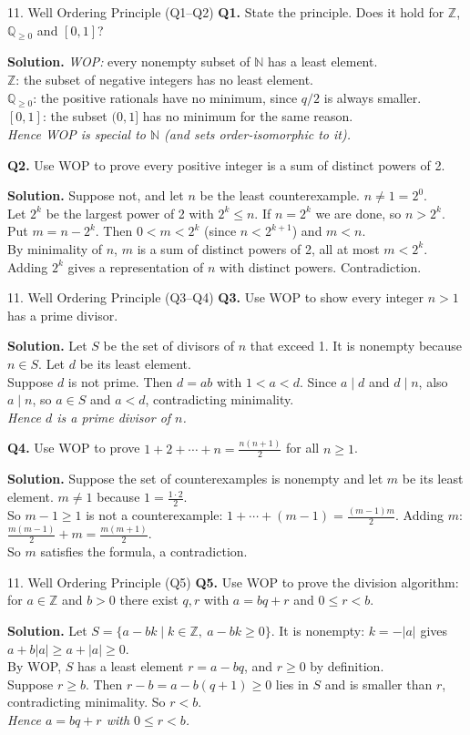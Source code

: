\documentclass[aspectratio=169,10pt]{beamer}
\newcommand{\qa}[3]{%
  \textbf{Q#1.} #2\par\smallskip
  {\color{ans}\textbf{Solution.} #3}\par\vspace{6pt}}
\begin{document}
\begin{frame}{11. Well Ordering Principle (Q1--Q2)}
\footnotesize
\qa{1}{State the principle. Does it hold for $\mathbb{Z}$, $\mathbb{Q}_{\ge0}$ and $[0,1]$?}
{\emph{WOP:} every nonempty subset of $\mathbb{N}$ has a least element.\\
$\mathbb{Z}$: the subset of negative integers has no least element.\\
$\mathbb{Q}_{\ge0}$: the positive rationals have no minimum, since $q/2$ is always smaller.\\
$[0,1]$: the subset $(0,1]$ has no minimum for the same reason.\\
\emph{Hence WOP is special to $\mathbb{N}$ (and sets order-isomorphic to it).}}
\qa{2}{Use WOP to prove every positive integer is a sum of distinct powers of 2.}
{Suppose not, and let $n$ be the least counterexample. $n\ne1=2^0$.\\
Let $2^k$ be the largest power of 2 with $2^k\le n$. If $n=2^k$ we are done, so $n>2^k$. Put $m=n-2^k$. Then $0<m<2^k$ (since $n<2^{k+1}$) and $m<n$.\\
By minimality of $n$, $m$ is a sum of distinct powers of 2, all at most $m<2^k$. Adding $2^k$ gives a representation of $n$ with distinct powers. Contradiction.}
\end{frame}

\begin{frame}{11. Well Ordering Principle (Q3--Q4)}
\footnotesize
\qa{3}{Use WOP to show every integer $n>1$ has a prime divisor.}
{Let $S$ be the set of divisors of $n$ that exceed 1. It is nonempty because $n\in S$. Let $d$ be its least element.\\
Suppose $d$ is not prime. Then $d=ab$ with $1<a<d$. Since $a\mid d$ and $d\mid n$, also $a\mid n$, so $a\in S$ and $a<d$, contradicting minimality.\\
\emph{Hence $d$ is a prime divisor of $n$.}}
\qa{4}{Use WOP to prove $1+2+\cdots+n=\frac{n(n+1)}{2}$ for all $n\ge1$.}
{Suppose the set of counterexamples is nonempty and let $m$ be its least element. $m\ne1$ because $1=\frac{1\cdot2}{2}$.\\
So $m-1\ge1$ is not a counterexample: $1+\cdots+(m-1)=\frac{(m-1)m}{2}$. Adding $m$: $\frac{m(m-1)}{2}+m=\frac{m(m+1)}{2}$.\\
So $m$ satisfies the formula, a contradiction.}
\end{frame}

\begin{frame}{11. Well Ordering Principle (Q5)}
\footnotesize
\qa{5}{Use WOP to prove the division algorithm: for $a\in\mathbb Z$ and $b>0$ there exist $q,r$ with $a=bq+r$ and $0\le r<b$.}
{Let $S=\{a-bk\mid k\in\mathbb Z,\ a-bk\ge0\}$. It is nonempty: $k=-|a|$ gives $a+b|a|\ge a+|a|\ge0$.\\
By WOP, $S$ has a least element $r=a-bq$, and $r\ge0$ by definition.\\
Suppose $r\ge b$. Then $r-b=a-b(q+1)\ge0$ lies in $S$ and is smaller than $r$, contradicting minimality. So $r<b$.\\
\emph{Hence $a=bq+r$ with $0\le r<b$.}}
\end{frame}
\end{document}
